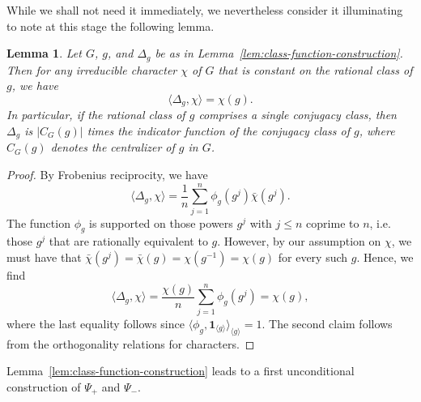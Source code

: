 \documentclass[12pt]{amsart}
\newtheorem{lemma}[theorem]{Lemma}
\theoremstyle{definition} \newtheorem{definition}[theorem]{Definition}
\theoremstyle{example} \newtheorem{example}[theorem]{Example}
\theoremstyle{remark} \newtheorem{remark}{Remark}[theorem]
\numberwithin{equation}{section}
\numberwithin{theorem}{section}
\renewcommand{\leq}{\leqslant}
\begin{document}
	While we shall not need it immediately, we nevertheless consider it illuminating to note at this stage the following lemma.  
	\begin{lemma} \label{lem:inner-product-when-conjugacy}
		Let $G$, $g$, and $\Delta_g$ be as in Lemma~\ref{lem:class-function-construction}.  Then for any irreducible character $\chi$ of $G$ that is constant on the rational class of $g$, we have
			\[
				\langle \Delta_g, \chi\rangle
					= \chi(g).
			\]
		In particular, if the rational class of $g$ comprises a single conjugacy class, then $\Delta_g$ is $|C_G(g)|$ times the indicator function of the conjugacy class of $g$, where $C_G(g)$ denotes the centralizer of $g$ in $G$.
	\end{lemma}
	\begin{proof}
		By Frobenius reciprocity, we have
			\[
				\langle \Delta_g, \chi\rangle
					= \frac{1}{n} \sum_{j=1}^n \phi_g(g^j) \bar\chi(g^j).
			\]
		The function $\phi_g$ is supported on those powers $g^j$ with $j \leq n$ coprime to $n$, i.e. those $g^j$ that are rationally equivalent to $g$.  However, by our assumption on $\chi$, we must have that $\bar\chi(g^j) = \bar\chi(g) = \chi(g^{-1}) = \chi(g)$ for every such $g$.  Hence, we find
			\[
				\langle \Delta_g, \chi\rangle
					= \frac{\chi(g)}{n} \sum_{j=1}^n \phi_g(g^j) 
					= \chi(g),
			\]
		where the last equality follows since $\langle \phi_g, \mathbf{1}_{\langle g \rangle} \rangle_{\langle g \rangle} = 1$.  The second claim follows from the orthogonality relations for characters.
	\end{proof}
	
	Lemma~\ref{lem:class-function-construction} leads to a first unconditional construction of $\Psi_+$ and $\Psi_-$.
	
\end{document}
